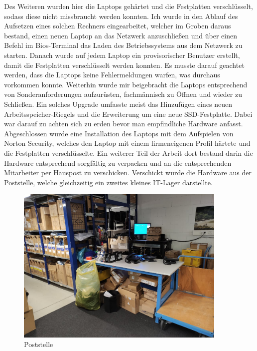 Des Weiteren wurden hier die Laptops gehärtet und die Festplatten verschlüsselt, sodass diese nicht missbraucht werden konnten. Ich wurde in den Ablauf des Aufsetzen eines solchen Rechners eingearbeitet, welcher im Groben daraus bestand, einen neuen Laptop an das Netzwerk anzuschließen und über einen Befehl im Bios-Terminal das Laden des Betriebssystems aus dem Netzwerk zu starten. Danach wurde auf jedem Laptop ein provisorischer Benutzer erstellt, damit die Festplatten verschlüsselt werden konnten. Es musste darauf geachtet werden, dass die Laptops keine Fehlermeldungen warfen, was durchaus vorkommen konnte. Weiterhin wurde mir beigebracht die Laptops entsprechend von Sonderanforderungen aufzurüsten, fachmännisch zu Öffnen und wieder zu Schließen. Ein solches Upgrade umfasste meist das Hinzufügen eines neuen Arbeitsspeicher-Riegels und die Erweiterung um eine neue SSD-Festplatte. Dabei war darauf zu achten sich zu erden bevor man empfindliche Hardware anfasst. Abgeschlossen wurde eine Installation des Laptops mit dem Aufspielen von Norton Security, welches den Laptop mit einem firmeneigenen Profil härtete und die Festplatten verschlüsselte. Ein weiterer Teil der Arbeit dort bestand darin die Hardware entsprechend sorgfältig zu verpacken und an die entsprechenden Mitarbeiter per Hauspost zu verschicken. Verschickt wurde die Hardware aus der Poststelle, welche gleichzeitig ein zweites kleines IT-Lager darstellte.
\begin{figure}[H] 
  \centering
     \includegraphics[width=0.9\textwidth]{poststelle.jpg}
  \caption{Poststelle}
  \label{fig:Bild1}
\end{figure} 
